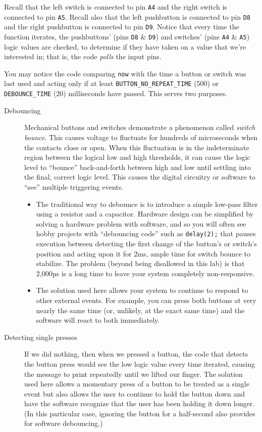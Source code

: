 Recall that the left switch is connected to pin \texttt{A4} and the right
switch is connected to pin \texttt{A5}. Recall also that the left pushbutton is
connected to pin \texttt{D8} and the right pushbutton is connected to pin
\texttt{D9}. Notice that every time the  function iterates,
the pushbuttons' (pins \texttt{D8} \& \texttt{D9}) and switches' (pins
\texttt{A4} \& \texttt{A5}) logic values are checked, to determine if they have
taken on a value that we're interested in; that is, the code \textit{polls} the
input pins.

You may notice the code comparing \lstinline{now} with the time a button or
switch was last used and acting only if at least
\lstinline{BUTTON_NO_REPEAT_TIME} (500) or \lstinline{DEBOUNCE_TIME} (20)
milliseconds have passed. This serves two purposes.
\begin{description}
\item [Debouncing] Mechanical buttons and switches demonstrate a phenomenon
    called \textit{switch bounce}. This causes voltage to fluctuate for
    hundreds of microseconds when the contacts close or open. When this
    fluctuation is in the indeterminate region between the logical low and high
    thresholds, it can cause the logic level to ``bounce'' back-and-forth
    between high and low until settling into the final, correct logic level.
    This causes the digital circuitry or software to ``see'' multiple
    triggering events. \\
    \begin{itemize}
    \item The traditional way to debounce is to introduce a simple low-pass
    filter using a resistor and a capacitor. Hardware design can be
    simplified by solving a hardware problem with software, and so you will
    often see hobby projects with ``debouncing code'' such as
    \lstinline{delay(2);} that pauses execution between detecting the first
    change of the button's or switch's position and acting upon it for 2ms,
    ample time for switch bounce to stabilize. The problem (beyond
     being disallowed in this lab) is that
    2,000µs is a long time to leave your system completely non-responsive.
    \item The solution used here allows your system to continue to respond to
    other external events. For example, you can press both buttons at very
    nearly the same time (or, unlikely, at the exact same time) and the
    software will react to both immediately.
    \end{itemize}
\item [Detecting single presses] If we did nothing, then when we pressed a
    button, the code that detects the button press would see the low logic
    value every time  iterated, causing the message to print
    repeatedly until we lifted our finger. The solution used here allows a
    momentary press of a button to be treated as a single event but also allows
    the user to continue to hold the button down and have the software
    recognize that the user has been holding it down longer. (In this
    particular case, ignoring the button for a half-second also provides for
    software debouncing.)
\end{description}

